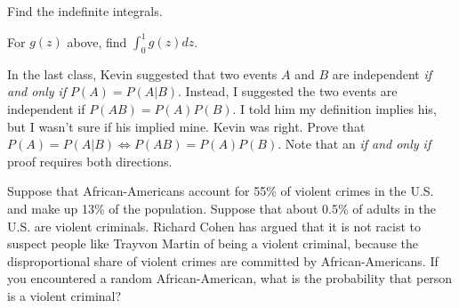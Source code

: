 \documentclass[10pt]{exam2}
\begin{document}
\begin{questions}

\question Find the indefinite integrals.

\question For $g(z)$ above, find $\int_0^1g(z) dz$.

\question In the last class, Kevin suggested that two events $A$ and $B$ are independent \textit{if and only if} $P(A) = P(A|B)$. Instead, I suggested the two events are independent if $P(AB) = P(A)P(B)$. I told him my definition implies his, but I wasn't sure if his implied mine. Kevin was right. Prove that $P(A) = P(A|B) \iff P(AB) = P(A)P(B)$. Note that an \textit{if and only if} proof requires both directions.

\question Suppose that African-Americans account for 55\% of violent crimes in the U.S. and make up 13\% of the population. Suppose that about 0.5\% of adults in the U.S. are violent criminals. Richard Cohen has argued that it is not racist to suspect people like Trayvon Martin of being a violent criminal, because the disproportional share of violent crimes are committed by African-Americans. If you encountered a random African-American, what is the probability that person is a violent criminal?


\end{questions}
\end{document}

